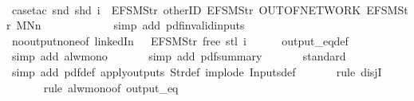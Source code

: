 \begin{isabellebody}
\ \ \ \ \isamarkupfalse%
\ {\isacharparenleft}case{\isacharunderscore}tac\ {\isachardoublequoteopen}{\isacharparenleft}snd\ {\isacharparenleft}shd\ i{\isacharparenright}{\isacharparenright}\ {\isacharequal}\ {\isacharbrackleft}EFSM{\isachardot}Str\ {\isacharprime}{\isacharprime}otherID{\isacharprime}{\isacharprime}{\isacharcomma}\ EFSM{\isachardot}Str\ {\isacharprime}{\isacharprime}OUT{\isacharunderscore}OF{\isacharunderscore}NETWORK{\isacharprime}{\isacharprime}{\isacharcomma}\ EFSM{\isachardot}Str\ {\isacharprime}{\isacharprime}MNn{}{\isacharprime}{\isacharprime}{\isacharbrackright}{\isachardoublequoteclose}{\isacharparenright}\isanewline
\ \ \ \ \ \isamarkupfalse%
\isanewline
\ \ \ \ \ \isamarkupfalse%
\ {\isacharparenleft}simp\ add{\isacharcolon}\ pdf{\isacharunderscore}{}{\isacharunderscore}invalid{\isacharunderscore}inputs{\isacharparenright}\isanewline
\ \ \ \ \isamarkupfalse%
\ no{\isacharunderscore}output{\isacharunderscore}none{\isacharbrackleft}of\ linkedIn\ {\isachardoublequoteopen}{\isacharparenleft}{\isacharless}{\isachargreater}{\isacharparenleft}{}\ {\isacharcolon}{\isacharequal}\ EFSM{\isachardot}Str\ {\isacharprime}{\isacharprime}free{\isacharprime}{\isacharprime}{\isacharparenright}{\isacharparenright}{\isachardoublequoteclose}\ {\isachardoublequoteopen}{\isacharparenleft}stl\ i{\isacharparenright}{\isachardoublequoteclose}{\isacharbrackright}\isanewline
\ \ \ \ \isamarkupfalse%
\ output_eq{\isacharunderscore}def\isanewline
\ \ \ \ \ \isamarkupfalse%
\ {\isacharparenleft}simp\ add{\isacharcolon}\ alw{\isacharunderscore}mono{\isacharparenright}\isanewline
\ \ \ \ \ \isamarkupfalse%
\ {\isacharparenleft}simp\ add{\isacharcolon}\ pdf{\isacharunderscore}summary{\isacharparenright}\isanewline
\ \ \ \ \ \isamarkupfalse%
\ standard\isanewline
\ \ \ \ \ \isamarkupfalse%
\ {\isacharparenleft}simp\ add{\isacharcolon}\ pdf{}{\isacharunderscore}def\ apply{\isacharunderscore}outputs\ Str{\isacharunderscore}def\ implode\ Inputs{\isacharunderscore}def{\isacharparenright}\isanewline
\ \ \ \ \ \isamarkupfalse%
\ {\isacharparenleft}rule\ disjI{}{\isacharparenright}\isanewline
\ \ \ \ \ \isamarkupfalse%
\ {\isacharparenleft}rule\ alw{\isacharunderscore}mono{\isacharbrackleft}of\ {\isachardoublequoteopen}output_eq\ {\isacharbrackleft}{\isacharbrackright}{\isachardoublequoteclose}{\isacharbrackright}{\isacharparenright}\isanewline

\end{isabellebody}
